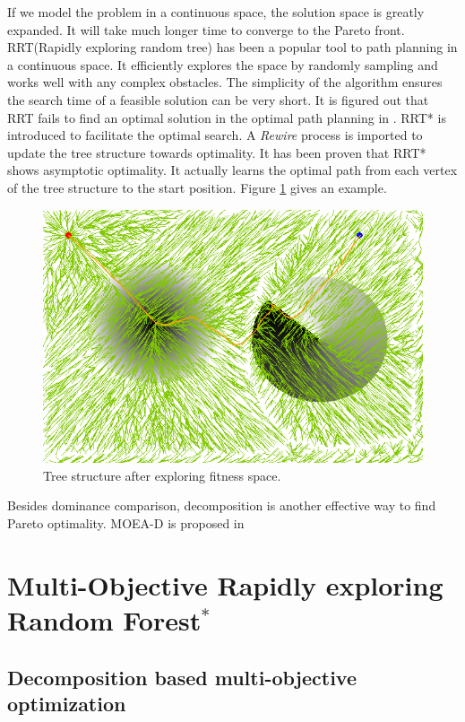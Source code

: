 \documentclass[conference]{IEEEtran}
\begin{document}
If we model the problem in a continuous space, the solution space is greatly expanded. 
It will take much longer time to converge to the Pareto front.
RRT(Rapidly exploring random tree) has been a popular tool to path planning in a continuous space.
It efficiently explores the space by randomly sampling and works well with any complex obstacles.
The simplicity of the algorithm ensures the search time of a feasible solution can be very short.
It is figured out that RRT fails to find an optimal solution in the optimal path planning in \cite{Karaman.Frazzoli:RSS10}.
RRT* is introduced to facilitate the optimal search.
A \emph{Rewire} process is imported to update the tree structure towards optimality.
It has been proven that RRT* shows asymptotic optimality.
It actually learns the optimal path from each vertex of the tree structure to the start position.
Figure \ref{fig:RRTstar2} gives an example.
\begin{figure}
\centering
\includegraphics[width=0.7\linewidth]{fig/RRTstar2}
\caption{Tree structure after exploring fitness space.}
\label{fig:RRTstar2}
\end{figure}

Besides dominance comparison, decomposition is another effective way to find Pareto optimality.
MOEA-D is proposed in \cite{4358754} 

\section{Multi-Objective Rapidly exploring Random Forest$^{*}$}
\label{sec:morrt}

\subsection{Decomposition based multi-objective optimization}
\end{document}
